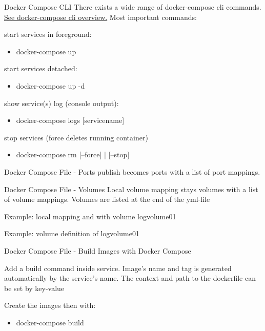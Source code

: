 \documentclass[10pt,aspectratio=\ratio,
compress
]{beamer}
\begin{document}
\begin{frame}{Docker Compose CLI}
There exists a wide range of docker-compose cli commands.
\href{https://docs.docker.com/compose/reference/overview/}{See docker-compose cli overview.} Most important commands:

start services in foreground:
\begin{itemize}
	\item docker-compose up
\end{itemize}
start services detached:
\begin{itemize}
	\item docker-compose up -d
\end{itemize}
show service(s) log (console output):
\begin{itemize}
	\item docker-compose logs [servicename]
\end{itemize}
stop services (force deletes running container)
\begin{itemize}
	\item docker-compose rm [--force] | [--stop]
\end{itemize}

\end{frame}

\begin{frame}{Docker Compose File - Ports}
publish becomes ports with a list of port mappings.


\end{frame}

\begin{frame}{Docker Compose File - Volumes}
Local volume mapping stays volumes with a list of volume mappings.
Volumes are listed at the end of the yml-file

Example: local mapping and with volume logvolume01

Example: volume definition of logvolume01
\end{frame}

\begin{frame}{Docker Compose File - Build Images with Docker Compose}

Add a build command inside service.
Image's name and tag is generated automatically by the service's name.
The context and path to the dockerfile can be set by key-value

Create the images then with:
\begin{itemize}
	\item docker-compose build
\end{itemize}
\end{frame}
\end{document}
